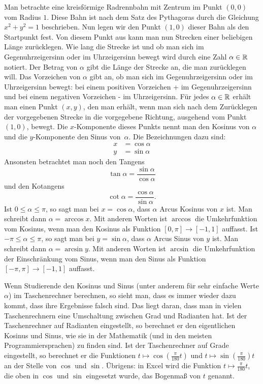 \begin{bem} 
 Man betrachte eine kreisförmige Radrennbahn mit Zentrum im Punkt $(0,0)$ vom Radius $1$. Diese Bahn ist nach dem Satz des Pythagoras durch die Gleichung $x^2 + y^2 = 1$ beschrieben. Nun legen wir den Punkt $(1,0)$ dieser Bahn als den Startpunkt fest. Von diesem Punkt aus kann man nun Strecken einer beliebigen Länge zurücklegen. Wie lang die Strecke ist und ob man sich im Gegenuhrzeigersinn oder im Uhrzeigersinn bewegt wird durch eine Zahl $\alpha \in \mathbb{R}$ notiert. Der Betrag von $\alpha$ gibt die Länge der Strecke an, die man zurücklegen will. Das Vorzeichen von $\alpha$ gibt an, ob man sich im Gegenuhrzeigersinn oder im Uhrzeigersinn bewegt: bei einem positiven Vorzeichen + im Gegenuhrzeigersinn und bei einem negativen Vorzeichen - im Uhrzeigersinn. Für jedes $\alpha \in \mathbb{R}$ erhält man einen Punkt $(x,y)$, den man erhält, wenn man sich nach dem Zurücklegen der vorgegebenen Strecke in die vorgegebene Richtung, ausgehend vom Punkt $(1,0)$, bewegt. Die $x$-Komponente dieses Punkts nennt man den Kosinus von $\alpha$ und die $y$-Komponente den Sinus von~$\alpha$. Die Bezeichnungen dazu sind: 
 \begin{align*} 
 	x & = \cos \alpha
 	\\ y & = \sin \alpha 
 \end{align*}	
Ansonsten betrachtet man noch den Tangens 
\[
	\tan \alpha = \frac{\sin \alpha}{\cos \alpha}
\]
und den Kotangens 
 \[
 	\cot \alpha = \frac{\cos \alpha}{\sin \alpha}.
 \] 
 Ist $0 \le \alpha \le \pi$, so sagt man bei $x =\cos \alpha$, dass $\alpha$ Arcus Kosinus von $x$ ist. Man schreibt dann $\alpha = \arccos x$. Mit anderen Worten ist $\arccos$ die Umkehrfunktion vom Kosinus, wenn man den Kosinus als Funktion $[0,\pi] \to [-1,1]$ auffasst. 
 Ist $-\pi \le \alpha \le \pi$, so sagt man bei $y = \sin \alpha$, dass $\alpha$ Arcus Sinus von $y$ ist. Man schreibt dann 
 $\alpha = \arcsin y$. Mit anderen Worten ist $\arcsin$ die Umkehrfunktion der Einschränkung vom Sinus, wenn man den Sinus als Funktion $[-\pi,\pi] \to [-1,1]$ auffasst. 
\end{bem} 

\begin{bem} Wenn Studierende den Kosinus und Sinus (unter anderem für sehr einfache Werte $\alpha$) im Taschenrechner berechnen, so sieht man, dass es immer wieder dazu kommt, dass ihre Ergebnisse falsch sind. Das liegt daran, dass man in vielen Taschenrechnern eine Umschaltung zwischen Grad und Radianten hat. Ist der Taschenrechner auf Radianten eingestellt, so berechnet er den eigentlichen  Kosinus und Sinus, wie sie in der Mathematik (und in den meisten Programmiersprachen) zu finden sind. Ist der Taschenrechner auf Grade eingestellt, so berechnet er die Funktionen $t \mapsto \cos( \frac{\pi}{180}t)$ und $t \mapsto \sin( \frac{\pi}{180})t$ an der Stelle von $\cos$ und $\sin$. Übrigens: in Excel wird die Funktion $t \mapsto \frac{\pi}{180} t$, die oben in $\cos$ und $\sin$ eingesetzt wurde, das Bogenmaß von $t$ genannt. 
\end{bem} 


